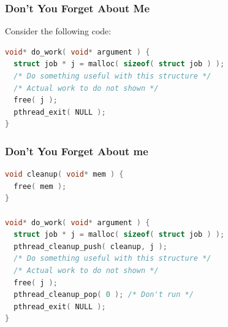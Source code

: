 \begin{frame}[fragile]
	\frametitle{Don't You Forget About Me}

	Consider the following code:
	\begin{lstlisting}[language=C]
void* do_work( void* argument ) {
  struct job * j = malloc( sizeof( struct job ) );
  /* Do something useful with this structure */
  /* Actual work to do not shown */
  free( j );
  pthread_exit( NULL );
}
\end{lstlisting}


\end{frame}



\begin{frame}[fragile]
	\frametitle{Don't You Forget About me}

	\begin{lstlisting}[language=C]
void cleanup( void* mem ) {
  free( mem );
}

void* do_work( void* argument ) {
  struct job * j = malloc( sizeof( struct job ) );
  pthread_cleanup_push( cleanup, j );
  /* Do something useful with this structure */
  /* Actual work to do not shown */
  free( j );
  pthread_cleanup_pop( 0 ); /* Don't run */
  pthread_exit( NULL );
}
\end{lstlisting}


\end{frame}







